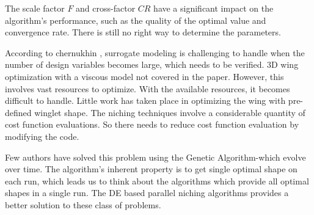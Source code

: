 The scale factor $F$ and cross-factor $ CR $ have a significant impact on the algorithm's performance, such as the quality of the optimal value and convergence rate. There is still no right way to determine the parameters\cite{chen}.

According to chernukhin \cite{oleg}, surrogate modeling is challenging to handle when the number of design variables becomes large, which needs to be verified. 3D wing optimization with a viscous model not covered in the paper. However, this involves vast resources to optimize. With the available resources, it becomes difficult to handle. Little work has taken place in optimizing the wing with pre-defined winglet shape. The niching techniques involve a considerable quantity of cost function evaluations. So there needs to reduce cost function evaluation by modifying the code.

Few authors have solved this problem using the Genetic Algorithm-which evolve over time. The algorithm's inherent property is to get single optimal shape on each run, which leads us to think about the algorithms which provide all optimal shapes in a single run. The DE based parallel niching algorithms provides a better solution to these class of problems. 

